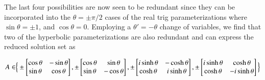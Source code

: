 The last four possibilities are now seen to be redundant since they can be incorporated into the $\theta = \pm \pi/2$ cases of the real trig parameterizations where $\sin\theta = \pm 1$, and $\cos\theta = 0$.   Employing a $\theta' = -\theta$ change of variables, we find that two of the hyperbolic parameterizations are also redundant and can express the reduced solution set as

\begin{align}\label{eqn:quadratricForm:voo19}
A \in \Bigr\{
\pm \begin{bmatrix}
\cos\theta & - \sin\theta \\
\sin\theta & \cos\theta \\
\end{bmatrix}, 
\pm \begin{bmatrix}
\cos\theta & \sin\theta \\
\sin\theta & - \cos\theta \\
\end{bmatrix}, 
\pm \begin{bmatrix}
i \sinh\theta & -\cosh\theta \\
\cosh\theta  & i \sinh\theta \\
\end{bmatrix}, 
\pm \begin{bmatrix}
i \sinh\theta & \cosh\theta \\
\cosh\theta  & - i \sinh\theta \\
\end{bmatrix}
\Bigl\}
\end{align}

\EndNoBibArticle
